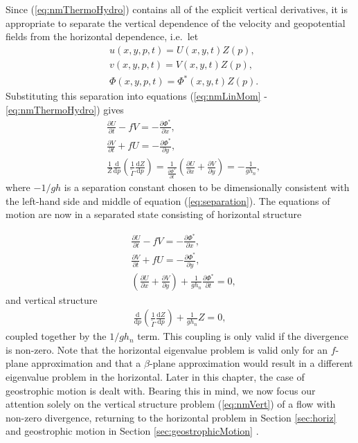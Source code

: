Since (\ref{eq:nmThermoHydro}) contains all of the explicit vertical derivatives, it is appropriate to separate the vertical dependence of the velocity and geopotential fields from the horizontal dependence, i.e.\ let 
\begin{align}
&u(x,y,p,t) = U(x,y,t) Z(p),\label{eq:separationBegin}\\
&v(x,y,p,t) = V(x,y,t) Z(p),\\
&\Phi(x,y,p,t) = \Phi^*(x,y,t) Z(p).\label{eq:separationEnd}
\end{align}
Substituting this separation into equations (\ref{eq:nmLinMom} - \ref{eq:nmThermoHydro}) gives
\begin{align}
&\frac{\partial U}{\partial t} - fV = -\frac{\partial \Phi^*}{\partial x},\\
&\frac{\partial V}{\partial t} + fU = -\frac{\partial \Phi^*}{\partial y},\\
&\frac{1}{Z}\frac{\text{d}}{\text{d} p} \left(\frac{1}{\tilde{\Gamma}}\frac{\text{d} Z}{\text{d} p}\right) = \frac{1}{\frac{\partial \Phi^*}{\partial t}} \left(\frac{\partial U}{\partial x} + \frac{\partial V}{\partial y}\right) = -\frac{1}{gh_n}, \label{eq:separation}
\end{align}
where $-1/gh$ is a separation constant chosen to be dimensionally consistent with the left-hand side and middle of equation (\ref{eq:separation}). The equations of motion are now in a separated state consisting of horizontal structure

\begin{align}
&\frac{\partial U}{\partial t} - fV = -\frac{\partial \Phi^*}{\partial x}, \label{eq:nmHorizBegin}\\
&\frac{\partial V}{\partial t} + fU = -\frac{\partial \Phi^*}{\partial y},\\
&\left(\frac{\partial U}{\partial x} + \frac{\partial V}{\partial y}\right) + \frac{1}{gh_n} \frac{\partial \Phi^*}{\partial t} = 0, \label{eq:nmHorizEnd}
\end{align}
and vertical structure
\begin{align}
\frac{\text{d}}{\text{d} p} \left( \frac{1}{\tilde{\Gamma}}\frac{\text{d} Z}{\text{d} p} \right) + \frac{1}{gh_n} Z = 0, \label{eq:nmVert}
\end{align}
coupled together by the $1/gh_n$ term. This coupling is only valid if the divergence is non-zero. Note that the horizontal eigenvalue problem is valid only for an $f$-plane approximation and that a $\beta$-plane approximation would result in a different eigenvalue problem in the horizontal. Later in this chapter, the case of geostrophic motion is dealt with. Bearing this in mind, we now focus our attention solely on the vertical structure problem (\ref{eq:nmVert}) of a flow with non-zero divergence, returning to the horizontal problem in Section \ref{sec:horiz} and geostrophic motion in Section \ref{sec:geostrophicMotion} .

